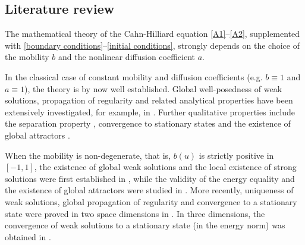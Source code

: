 \documentclass[11pt,  reqno]{amsart}%
\theoremstyle{plain}
\theoremstyle{definition}
\theoremstyle{remark}
\numberwithin{equation}{section}
\begin{document}
\subsection{Literature review}
The mathematical theory of the Cahn-Hilliard equation \eqref{A1}--\eqref{A2}, supplemented with \eqref{boundary conditions}--\eqref{initial conditions}, strongly depends on the choice of the mobility 
$b$ and the nonlinear diffusion coefficient $a$.

In the classical case of constant mobility and diffusion coefficients (e.g.
$b \equiv 1$ and $a\equiv1$), the theory is by now well established. Global well-posedness of weak solutions, propagation of regularity and related analytical properties have been extensively investigated, for example, in \cite{AbelsARMA,AbWNA,DDNA,EL1991,GGH2018}. Further qualitative properties include the separation property \cite{GGG2023,GP2024,HW2021,MZ2004}, convergence to stationary states  and the existence of global attractors \cite{AbWNA,MZ2004}.

When the mobility is non-degenerate, that is, $b(u)$ is strictly positive in $[-1,1]$, the existence of global weak solutions and the local existence of strong solutions were first established in \cite{BB1999}, while the validity of the energy equality and the existence of global attractors were studied in \cite{S2007}. More recently, uniqueness of weak solutions, global propagation of regularity and convergence to a stationary state were proved in two space dimensions in \cite{CGGG2025}. In three dimensions, the convergence of weak solutions to a stationary state (in the energy norm) was obtained in \cite{GP2025}. 
\end{document}
